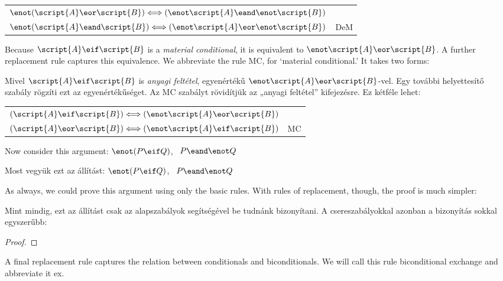 \begin{center}
\begin{tabular}{rl}
$\enot(\script{A}\eor\script{B}) \Longleftrightarrow (\enot\script{A}\eand\enot\script{B})$\\
$\enot(\script{A}\eand\script{B}) \Longleftrightarrow (\enot\script{A}\eor\enot\script{B})$
& DeM
\end{tabular}
\end{center}

Because $\script{A}\eif\script{B}$ is a \emph{material conditional}, it is equivalent to $\enot\script{A}\eor\script{B}$. A further replacement rule captures this equivalence. We abbreviate the rule MC, for `material conditional.' It takes two forms:

Mivel $\script{A}\eif\script{B}$ is \emph{anyagi feltétel}, egyenértékű $\enot\script{A}\eor\script{B}$-vel. Egy további helyettesítő szabály rögzíti ezt az egyenértékűséget. Az MC szabályt rövidítjük az „anyagi feltétel” kifejezésre. Ez kétféle lehet:

\begin{center}
\begin{tabular}{rl}
$(\script{A}\eif\script{B}) \Longleftrightarrow (\enot\script{A}\eor\script{B})$ &\\
$(\script{A}\eor\script{B}) \Longleftrightarrow (\enot\script{A}\eif\script{B})$ & MC
\end{tabular}
\end{center}

Now consider this argument: $\enot(P \eif Q)$, \therefore\ $P \eand \enot Q$

Most vegyük ezt az állítást: $\enot(P \eif Q)$, \therefore\ $P \eand \enot Q$

As always, we could prove this argument using only the basic rules. With rules of replacement, though, the proof is much simpler:

Mint mindig, ezt az állítást csak az alapszabályok segítségével be tudnánk bizonyítani. A csereszabályokkal azonban a bizonyítás sokkal egyszerűbb:

\begin{proof}
\end{proof}

A final replacement rule captures the relation between conditionals and biconditionals. We will call this rule biconditional exchange and abbreviate it {\eiff}{ex}.

